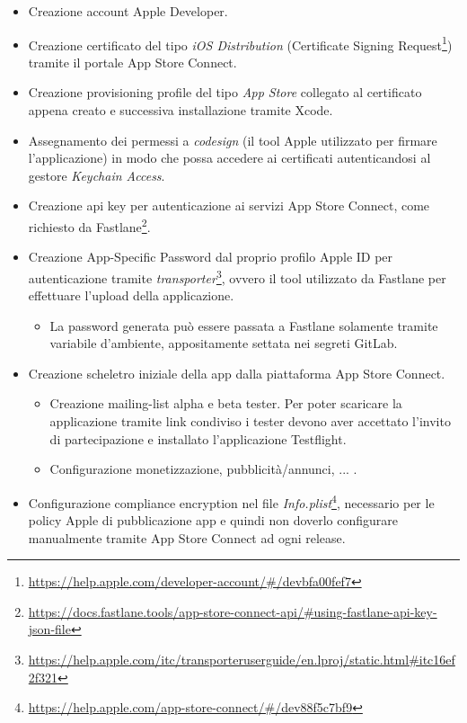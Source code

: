 \begin{itemize}
    \item Creazione account Apple Developer.
    \item Creazione certificato del tipo \textit{iOS Distribution} (Certificate Signing Request\footnote{\url{https://help.apple.com/developer-account/\#/devbfa00fef7}}) tramite il portale App Store Connect.
    \item Creazione provisioning profile del tipo \textit{App Store} collegato al certificato appena creato e successiva installazione tramite Xcode.
    \item Assegnamento dei permessi a \textit{codesign} (il tool Apple utilizzato per firmare l'applicazione) in modo che possa accedere ai certificati autenticandosi al gestore \textit{Keychain Access}.
    \item Creazione api key per autenticazione ai servizi App Store Connect, come richiesto da Fastlane\footnote{\url{https://docs.fastlane.tools/app-store-connect-api/\#using-fastlane-api-key-json-file}}.
    \item Creazione App-Specific Password dal proprio profilo Apple ID per autenticazione tramite \textit{transporter}\footnote{\url{https://help.apple.com/itc/transporteruserguide/en.lproj/static.html\#itc16ef2f321}}, ovvero il tool utilizzato da Fastlane per effettuare l'upload della applicazione. 
    \begin{itemize}
        \item La password generata può essere passata a Fastlane solamente tramite variabile d'ambiente, appositamente settata nei segreti GitLab.
    \end{itemize}
    \item Creazione scheletro iniziale della app dalla piattaforma App Store Connect.
    \begin{itemize}
        \item Creazione mailing-list alpha e beta tester. Per poter scaricare la applicazione tramite link condiviso i tester devono aver accettato l'invito di partecipazione e installato l'applicazione Testflight.
        \item Configurazione monetizzazione, pubblicità/annunci, ... .
    \end{itemize}
    \item Configurazione compliance encryption nel file \textit{Info.plist}\footnote{\url{https://help.apple.com/app-store-connect/\#/dev88f5c7bf9}}, necessario per le policy Apple di pubblicazione app e quindi non doverlo configurare manualmente tramite App Store Connect ad ogni release.
\end{itemize}

